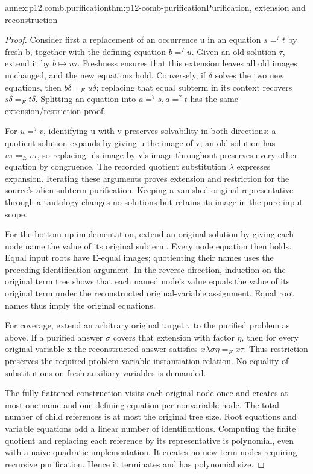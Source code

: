 \begin{annexitem}{annex:p12.comb.purification}{thm:p12-comb-purification}{Purification, extension and reconstruction}
\begin{proof}
Consider first a replacement of an occurrence u in an equation
\(s=^{?}t\) by fresh b, together with the defining equation
\(b=^{?}u\). Given an old solution \(\tau\), extend it by
\(b\mapsto u\tau\). Freshness ensures that this extension leaves
all old images unchanged, and the new equations hold. Conversely,
if \(\delta\) solves the two new equations, then
\(b\delta=_Eu\delta\); replacing that equal subterm in its context
recovers \(s\delta=_Et\delta\). Splitting an equation into
\(a=^{?}s,a=^{?}t\) has the same extension/restriction proof.

For \(u=^{?}v\), identifying u with v preserves solvability in both
directions: a quotient solution expands by giving u the image of v;
an old solution has \(u\tau=_Ev\tau\), so replacing u's image by
v's image throughout preserves every other equation by congruence.
The recorded quotient substitution \(\lambda\) expresses expansion.
Iterating these arguments proves extension and restriction for the
source's alien-subterm purification.
Keeping a vanished original representative through a tautology
changes no solutions but retains its image in the pure input scope.

For the bottom-up implementation, extend an original solution by
giving each node name the value of its original subterm. Every node
equation then holds. Equal input roots have E-equal images; quotienting
their names uses the preceding identification argument. In the reverse
direction, induction on the original term tree shows that each named
node's value equals the value of its original term under the
reconstructed original-variable assignment. Equal root names thus
imply the original equations.

For coverage, extend an arbitrary original target \(\tau\) to the
purified problem as above. If a purified answer \(\sigma\) covers that
extension with factor \(\eta\), then for every original variable x
the reconstructed answer satisfies
\(x\lambda\sigma\eta=_Ex\tau\). Thus restriction preserves the
required problem-variable instantiation relation. No equality of
substitutions on fresh auxiliary variables is demanded.

The fully flattened construction visits each original node once and
creates at most one name and one defining equation per nonvariable
node. The total number of child references is at most the original
tree size. Root equations and variable equations add a linear number
of identifications. Computing the finite quotient and replacing each
reference by its representative is polynomial, even with a naive
quadratic implementation. It creates no new term nodes requiring
recursive purification. Hence it terminates and has polynomial size.
\end{proof}
\end{annexitem}

